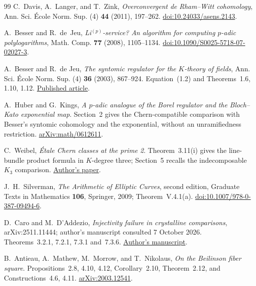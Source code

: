 \documentclass[11pt,a4paper]{article}
\theoremstyle{remark}
\begin{document}
\clearpage
{\small
\begin{thebibliography}{99}
C.~Davis, A.~Langer, and T.~Zink, \emph{Overconvergent de Rham--Witt
cohomology}, Ann. Sci. \'Ecole Norm. Sup. (4) \textbf{44} (2011),
197--262.
\href{https://doi.org/10.24033/asens.2143}{doi:10.24033/asens.2143}.

A.~Besser and R.~de~Jeu, \emph{Li$^{(p)}$-service? An algorithm for computing $p$-adic polylogarithms}, Math. Comp. \textbf{77} (2008), 1105--1134. \href{https://doi.org/10.1090/S0025-5718-07-02027-3}{doi:10.1090/S0025-5718-07-02027-3}.

A.~Besser and R.~de Jeu, \emph{The syntomic regulator for the $K$-theory of fields}, Ann. Sci. \'Ecole Norm. Sup. (4) \textbf{36} (2003), 867--924. Equation~(1.2) and Theorems~1.6, 1.10, 1.12.
\href{https://www.numdam.org/article/ASENS_2003_4_36_6_867_0.pdf}{Published article}.

A.~Huber and G.~Kings, \emph{A $p$-adic analogue of the Borel regulator and the Bloch--Kato exponential map}. Section~2 gives the Chern-compatible comparison with Besser's syntomic cohomology and the exponential, without an unramifiedness restriction.
\href{https://arxiv.org/abs/math/0612611}{arXiv:math/0612611}.

C.~Weibel, \emph{\'Etale Chern classes at the prime 2}. Theorem~3.11(i) gives the line-bundle product formula in $K$-degree three; Section~5 recalls the indecomposable $K_3$ comparison.
\href{https://sites.math.rutgers.edu/~weibel/archive/papers-dir/chernclass.pdf}{Author's paper}.

J.~H.~Silverman, \emph{The Arithmetic of Elliptic Curves}, second edition,
Graduate Texts in Mathematics \textbf{106}, Springer, 2009;
Theorem~V.4.1(a).
\href{https://doi.org/10.1007/978-0-387-09494-6}{doi:10.1007/978-0-387-09494-6}.

D.~Caro and M.~D'Addezio, \emph{Injectivity failure in crystalline comparisons},
arXiv:2511.11444; author's manuscript consulted 7 October 2026.
Theorems~3.2.1, 7.2.1, 7.3.1 and~7.3.6.
\href{https://carod.users.lmno.cnrs.fr/Injectivity.pdf}{Author's manuscript}.

B.~Antieau, A.~Mathew, M.~Morrow, and T.~Nikolaus,
\emph{On the Beilinson fiber square}. Propositions~2.8, 4.10, 4.12,
Corollary~2.10, Theorem~2.12, and Constructions~4.6, 4.11.
\href{https://arxiv.org/abs/2003.12541}{arXiv:2003.12541}.


\end{thebibliography}}
\end{document}
